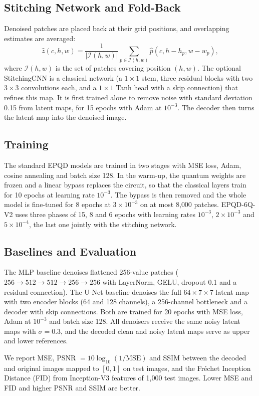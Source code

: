 \subsection{Stitching Network and Fold-Back}
Denoised patches are placed back at their grid positions, and overlapping estimates are averaged:
\begin{equation}
    \hat z(c,h,w)=
    \frac{1}{|\mathcal{I}(h,w)|}\sum_{p\in\mathcal{I}(h,w)}\hat p(c,h-h_p,w-w_p),
\end{equation}
where $\mathcal{I}(h,w)$ is the set of patches covering position $(h,w)$. The optional StitchingCNN is a classical network (a $1\times1$ stem, three residual blocks with two $3\times3$ convolutions each, and a $1\times1$ Tanh head with a skip connection) that refines this map. It is first trained alone to remove noise with standard deviation 0.15 from latent maps, for 15 epochs with Adam at $10^{-3}$. The decoder then turns the latent map into the denoised image.

\subsection{Training}
The standard EPQD models are trained in two stages with MSE loss, Adam, cosine annealing and batch size 128. In the warm-up, the quantum weights are frozen and a linear bypass replaces the circuit, so that the classical layers train for 10 epochs at learning rate $10^{-3}$. The bypass is then removed and the whole model is fine-tuned for 8 epochs at $3\times10^{-3}$ on at most 8{,}000 patches. EPQD-6Q-V2 uses three phases of 15, 8 and 6 epochs with learning rates $10^{-3}$, $2\times10^{-3}$ and $5\times10^{-4}$, the last one jointly with the stitching network.

\subsection{Baselines and Evaluation}
The MLP baseline denoises flattened 256-value patches ($256\rightarrow512\rightarrow512\rightarrow256\rightarrow256$ with LayerNorm, GELU, dropout 0.1 and a residual connection). The U-Net baseline denoises the full $64\times7\times7$ latent map with two encoder blocks (64 and 128 channels), a 256-channel bottleneck and a decoder with skip connections. Both are trained for 20 epochs with MSE loss, Adam at $10^{-3}$ and batch size 128. All denoisers receive the same noisy latent maps with $\sigma=0.3$, and the decoded clean and noisy latent maps serve as upper and lower references.

We report MSE, PSNR $=10\log_{10}(1/\mathrm{MSE})$ and SSIM between the decoded and original images mapped to $[0,1]$ on test images, and the Fr\'echet Inception Distance (FID) from Inception-V3 features of 1{,}000 test images. Lower MSE and FID and higher PSNR and SSIM are better.
